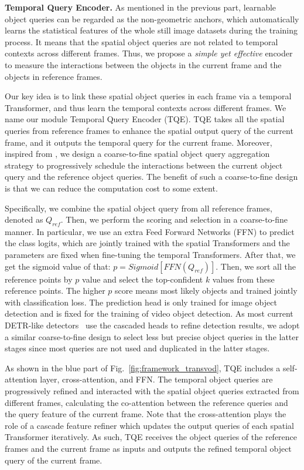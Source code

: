 \documentclass[10pt,journal,compsoc]{IEEEtran}
\begin{document}
\noindent
\textbf{Temporal Query Encoder.}
As mentioned in the previous part, learnable object queries can be regarded as the non-geometric anchors, which automatically learns the statistical features of the whole still image datasets during the training process. It means that the spatial object queries are not related to temporal contexts across different frames. Thus, we propose a \emph{simple yet effective} encoder to measure the interactions between the objects in the current frame and the objects in reference frames. 

Our key idea is to link these spatial object queries in each frame via a temporal Transformer, and thus learn the temporal contexts across different frames. We name our module Temporal Query Encoder (TQE). TQE takes all the spatial queries from reference frames to enhance the spatial output query of the current frame, and it outputs the temporal query for the current frame. Moreover, inspired from \cite{deng19rdn}, we design a coarse-to-fine spatial object query aggregation strategy to progressively schedule the interactions between the current object query and the reference object queries. The benefit of such a coarse-to-fine design is that we can reduce the computation cost to some extent. 

Specifically, we combine the spatial object query from all reference frames, denoted as $Q_{ref}$. Then, we perform the scoring and selection in a coarse-to-fine manner. In particular, we use an extra Feed Forward Networks (FFN) to predict the class logits, which are jointly trained with the spatial Transformers and the parameters are fixed when fine-tuning the temporal Transformers.
After that, we get the sigmoid value of that: $p=Sigmoid [ FFN(Q_{ref}) ]$. Then, we sort all the reference points by $p$ value and select the top-confident $k$ values from these reference points. The higher $p$ score means most likely objects and trained jointly with classification loss. The prediction head is only  trained for image object detection and is fixed for the training of video object detection. As most current DETR-like detectors~\cite{detr,zhu2020deformable} use the cascaded heads to refine detection results, we adopt a similar coarse-to-fine design to select less but precise object queries in the latter stages since most queries are not used and duplicated in the latter stages.


As shown in the blue part of Fig.~\ref{fig:framework_transvod}, TQE includes a self-attention layer, cross-attention, and FFN.
The temporal object queries are progressively refined and interacted with the spatial object queries extracted from different frames, calculating the co-attention between the reference queries and the query feature of the current frame. Note that the cross-attention plays the role of a cascade feature refiner which updates the output queries of each spatial Transformer iteratively. As such, TQE receives the object queries of the reference frames and the current frame as inputs and outputs the refined temporal object query of the current frame.
\end{document}
